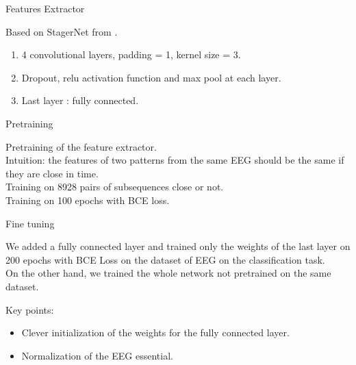 \begin{frame}{Features Extractor}

    Based on StagerNet from \cite{banville2021uncovering}. 
    \begin{exampleblock}

        \begin{enumerate}
            \item 4 convolutional layers, padding = 1, kernel size = 3. 
            \item Dropout, relu activation function and max pool at each layer. 
            \item Last layer : fully connected. 
        \end{enumerate}
        
    \end{exampleblock}
    
\end{frame}


\begin{frame}{Pretraining}

    Pretraining of the feature extractor. \\

    Intuition: the features of two patterns from the same EEG should be the same if they are close in time. \\
    Training on 8928 pairs of subsequences close or not. \\
    Training on 100 epochs with BCE loss.\\
    
\end{frame}

\begin{frame}{Fine tuning}
    
    We added a fully connected layer and trained only the weights of the last layer on 200 epochs with BCE Loss on the dataset of EEG on the classification task. \\

    On the other hand, we trained the whole network not pretrained on the same dataset.

    Key points: 
    \begin{itemize}
        \item Clever initialization of the weights for the fully connected layer.
        \item Normalization of the EEG essential. 
    \end{itemize}
    
\end{frame}


